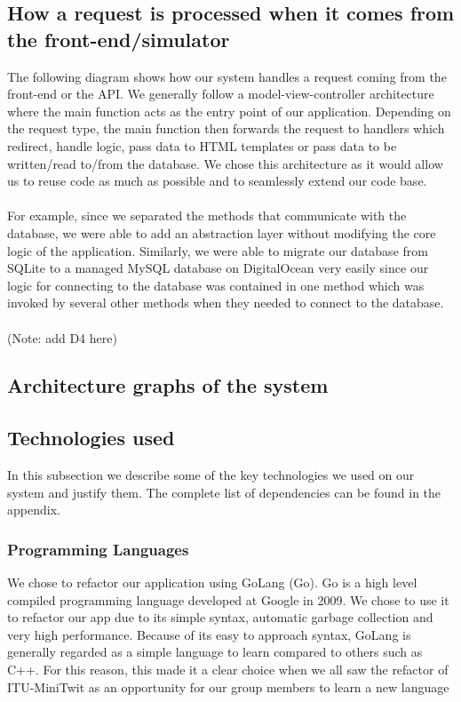 \documentclass{article}
\begin{document}
\subsection{How a request is processed when it comes from the front-end/simulator}
The following diagram shows how our system handles a request coming from the front-end or the API. We generally follow a model-view-controller architecture where the main function acts as the entry point of our application. Depending on the request type, the main function then forwards the request to handlers which redirect, handle logic, pass data to HTML templates or pass data to be written/read to/from the database. We chose this architecture as it would allow us to reuse code as much as possible and to seamlessly extend our code base. 
\\\\
For example, since we separated the methods that communicate with the database, we were able to add an abstraction layer without modifying the core logic of the application. Similarly, we were able to migrate our database from SQLite to a managed MySQL database on DigitalOcean very easily since our logic for connecting to the database was contained in one method which was invoked by several other methods when they needed to connect to the database.
\\\\
(Note: add D4 here)

\subsection{Architecture graphs of the system}

\subsection{Technologies used}
In this subsection we describe some of the key technologies we used on our system and justify them. The complete list of dependencies can be found in the appendix.

\subsubsection{Programming Languages}We chose to refactor our application using GoLang (Go). Go is a high level compiled programming language developed at Google in 2009. We chose to use it to refactor our app due to its simple syntax, automatic garbage collection and very high performance. Because of its easy to approach syntax, GoLang is generally regarded as a simple language to learn compared to others such as C++. For this reason, this made it a clear choice when we all saw the refactor of ITU-MiniTwit as an opportunity for our group members to learn a new language
\end{document}
